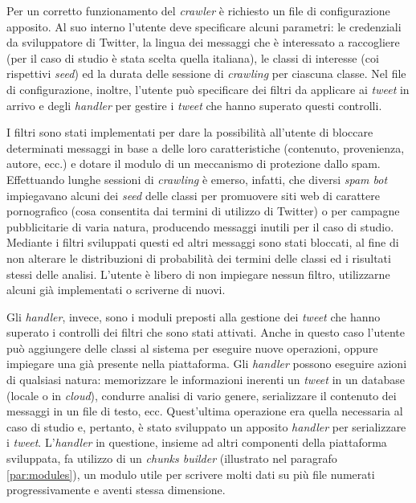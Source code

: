 Per un corretto funzionamento del \textit{crawler} è richiesto un file di configurazione apposito. Al suo interno l’utente deve specificare alcuni parametri: le credenziali da sviluppatore 
di Twitter, la lingua dei messaggi che è interessato a raccogliere (per il caso di studio è stata scelta quella italiana), le classi di interesse (coi rispettivi \textit{seed}) ed la durata 
delle sessione di \textit{crawling} per ciascuna classe. Nel file di configurazione, inoltre, l’utente può specificare dei filtri da applicare ai \textit{tweet} in arrivo e degli \textit{handler} per gestire 
i \textit{tweet} che hanno superato questi controlli.

I filtri sono stati implementati per dare la possibilità all’utente di bloccare determinati messaggi in base a delle loro caratteristiche (contenuto, provenienza, autore, ecc.) e 
dotare il modulo di un meccanismo di protezione dallo spam. Effettuando lunghe sessioni di \textit{crawling} è emerso, infatti, che diversi \textit{spam bot} impiegavano alcuni dei \textit{seed} delle classi
per promuovere siti web di carattere pornografico (cosa consentita dai termini di utilizzo di Twitter) o per campagne pubblicitarie di varia natura, producendo messaggi inutili per
il caso di studio. Mediante i filtri sviluppati questi ed altri messaggi sono stati bloccati, al fine di non alterare le distribuzioni di probabilità dei termini delle classi ed i 
risultati stessi delle analisi. L’utente è libero di non impiegare nessun filtro, utilizzarne alcuni già implementati o scriverne di nuovi.

Gli \textit{handler}, invece, sono i moduli preposti alla gestione dei \textit{tweet} che hanno superato i controlli dei filtri che sono stati attivati. Anche in questo caso l’utente può aggiungere
delle classi al sistema per eseguire nuove operazioni, oppure impiegare una già presente nella piattaforma. Gli \textit{handler} possono eseguire azioni di qualsiasi natura: memorizzare le 
informazioni inerenti un \textit{tweet} in un database (locale o in \textit{cloud}), condurre analisi di vario genere, serializzare il contenuto dei messaggi in un file di testo, ecc. Quest’ultima 
operazione era quella necessaria al caso di studio e, pertanto, è stato sviluppato un apposito \textit{handler} per serializzare i \textit{tweet}. L’\textit{handler} in questione, insieme ad altri componenti 
della piattaforma sviluppata, fa utilizzo di un \textit{chunks builder} (illustrato nel paragrafo \ref{par:modules}), un modulo utile per scrivere molti dati su più file numerati 
progressivamente e aventi stessa dimensione.

